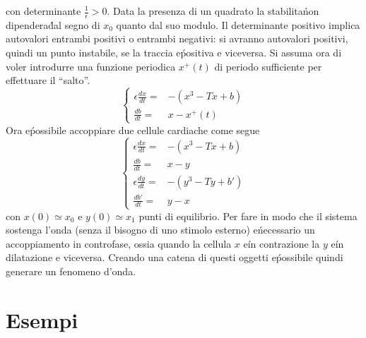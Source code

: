 \documentclass[12pt, a4paper]{book}
\theoremstyle{theorem}
\begin{document}
			con determinante $\frac{1}{\epsilon}>0$.
			Data la presenza di un quadrato la stabilita\' non dipendera\' dal segno di $x_0$ quanto dal suo modulo.
			Il determinante positivo implica autovalori entrambi positivi o entrambi negativi: si avranno autovalori positivi, quindi un punto instabile, se la traccia e\' positiva e viceversa.
			Si assuma ora di voler introdurre una funzione periodica $x^+(t)$ di periodo sufficiente per effettuare il ``salto''.
			\begin{equation*}
				\begin{cases}
					\epsilon\frac{dx}{dt}=&-\left(x^3-Tx+b\right)\\
					\frac{db}{dt}=&x-x^+(t)
				\end{cases}
			\end{equation*}
			Ora e\' possibile accoppiare due cellule cardiache come segue
			\begin{equation*}
				\begin{cases}
					\epsilon\frac{dx}{dt}=&-\left(x^3-Tx+b\right)\\
					\frac{db}{dt}=&x-y\\
					\epsilon\frac{dy}{dt}=&-\left(y^3-Ty+b'\right)\\
					\frac{db'}{dt}=&y-x
				\end{cases}
			\end{equation*}
			con $x(0)\simeq x_0$ e $y(0)\simeq x_1$ punti di equilibrio.
			Per fare in modo che il sistema sostenga l'onda (senza il bisogno di uno stimolo esterno) e\' necessario un accoppiamento in controfase, ossia quando la cellula $x$ e\' in contrazione la $y$ e\' in dilatazione e viceversa.
			Creando una catena di questi oggetti e\' possibile quindi generare un fenomeno d'onda.

		\section{Esempi}
\end{document}
